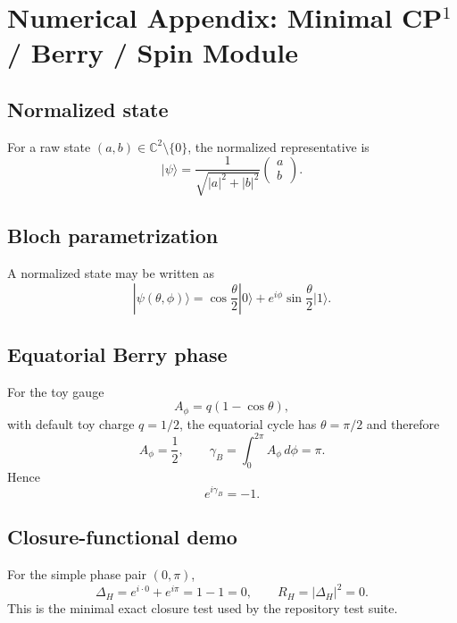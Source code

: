 \appendix
\section{Numerical Appendix: Minimal CP$^1$ / Berry / Spin Module}
\label{app:minimal-cp1-berry-spin}

\subsection{Normalized state}
For a raw state $(a,b) \in \mathbb{C}^2 \setminus \{0\}$, the normalized representative is
\begin{equation}
|\psi\rangle = \frac{1}{\sqrt{|a|^2 + |b|^2}} \begin{pmatrix} a \\ b \end{pmatrix}.
\end{equation}

\subsection{Bloch parametrization}
A normalized state may be written as
\begin{equation}
|\psi(\theta,\phi)\rangle = \cos\frac{\theta}{2}|0\rangle + e^{i\phi}\sin\frac{\theta}{2}|1\rangle.
\end{equation}

\subsection{Equatorial Berry phase}
For the toy gauge
\begin{equation}
A_\phi = q(1-\cos\theta),
\end{equation}
with default toy charge $q=1/2$, the equatorial cycle has $\theta=\pi/2$ and therefore
\begin{equation}
A_\phi = \frac12,
\qquad
\gamma_B = \int_0^{2\pi} A_\phi \, d\phi = \pi.
\end{equation}
Hence
\begin{equation}
e^{i\gamma_B} = -1.
\end{equation}

\subsection{Closure-functional demo}
For the simple phase pair $(0,\pi)$,
\begin{equation}
\Delta_H = e^{i\cdot 0} + e^{i\pi} = 1 - 1 = 0,
\qquad
R_H = |\Delta_H|^2 = 0.
\end{equation}
This is the minimal exact closure test used by the repository test suite.

